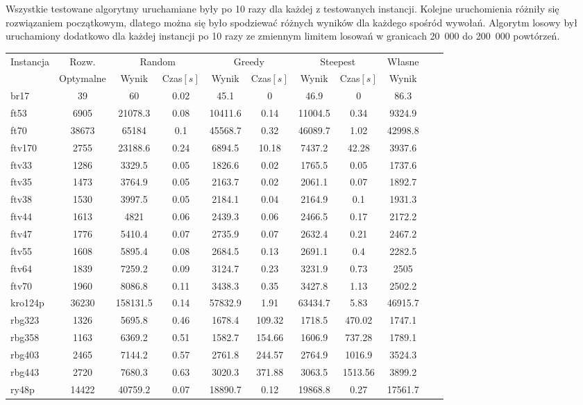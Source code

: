 Wszystkie testowane algorytmy uruchamiane
były po 10 razy dla każdej z testowanych instancji. Kolejne uruchomienia
różniły się rozwiązaniem początkowym, dlatego można się było spodziewać
różnych wyników dla każdego spośród wywołań. Algorytm 
losowy był uruchamiony dodatkowo dla każdej instancji po 10 razy ze zmiennym
limitem losowań w granicach 20~000 do 200~000 powtórzeń.

\begin{center}

\begin{tabular}{lcccccccccc}

\toprule
\multirow{2}{*}{Instancja} & {Rozw.} &
\multicolumn{2}{c}{Random} & \multicolumn{2}{c}{Greedy} &
\multicolumn{2}{c}{Steepest} & Własne\\
 &  Optymalne & Wynik & Czas$[s]$& Wynik & Czas$[s]$ & Wynik & Czas$[s]$& Wynik \\
\toprule
br17 & 39 & 60 & 0.02 & 45.1 & 0 & 46.9 & 0 & 86.3 \\
\midrule
ft53 & 6905 & 21078.3 & 0.08 & 10411.6 & 0.14 & 11004.5 & 0.34 & 9324.9 \\
\midrule
ft70 & 38673 & 65184 & 0.1 & 45568.7 & 0.32 & 46089.7 & 1.02 & 42998.8 \\
\midrule
ftv170 & 2755 & 23188.6 & 0.24 & 6894.5 & 10.18 & 7437.2 & 42.28 & 3937.6 \\
\midrule
ftv33 & 1286 & 3329.5 & 0.05 & 1826.6 & 0.02 & 1765.5 & 0.05 & 1737.6 \\
\midrule
ftv35 & 1473 & 3764.9 & 0.05 & 2163.7 & 0.02 & 2061.1 & 0.07 & 1892.7 \\
\midrule
ftv38 & 1530 & 3997.5 & 0.05 & 2184.1 & 0.04 & 2164.9 & 0.1 & 1931.3 \\
\midrule
ftv44 & 1613 & 4821 & 0.06 & 2439.3 & 0.06 & 2466.5 & 0.17 & 2172.2 \\
\midrule
ftv47 & 1776 & 5410.4 & 0.07 & 2735.9 & 0.07 & 2632.4 & 0.21 & 2467.2 \\
\midrule
ftv55 & 1608 & 5895.4 & 0.08 & 2684.5 & 0.13 & 2691.1 & 0.4 & 2282.5 \\
\midrule
ftv64 & 1839 & 7259.2 & 0.09 & 3124.7 & 0.23 & 3231.9 & 0.73 & 2505 \\
\midrule
ftv70 & 1960 & 8086.8 & 0.11 & 3438.3 & 0.35 & 3427.8 & 1.13 & 2502.2 \\
\midrule
kro124p & 36230 & 158131.5 & 0.14 & 57832.9 & 1.91 & 63434.7 & 5.83 & 46915.7 \\
\midrule
rbg323 & 1326 & 5695.8 & 0.46 & 1678.4 & 109.32 & 1718.5 & 470.02 & 1747.1 \\
\midrule
rbg358 & 1163 & 6369.2 & 0.51 & 1582.7 & 154.66 & 1606.9 & 737.28 & 1789.1 \\
\midrule
rbg403 & 2465 & 7144.2 & 0.57 & 2761.8 & 244.57 & 2764.9 & 1016.9 & 3524.3 \\
\midrule
rbg443 & 2720 & 7680.3 & 0.63 & 3020.3 & 371.88 & 3063.5 & 1513.56 & 3899.2 \\
\midrule
ry48p & 14422 & 40759.2 & 0.07 & 18890.7 & 0.12 & 19868.8 & 0.27 & 17561.7 \\
\bottomrule
\end{tabular}
\end{center}

